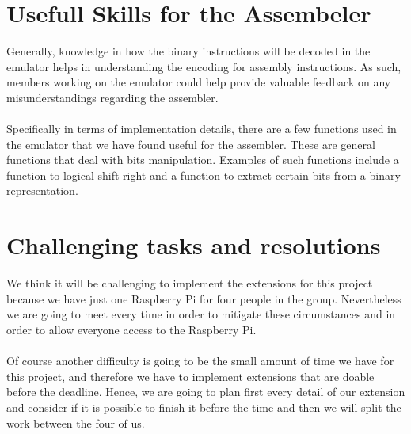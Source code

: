 \documentclass[a4paper]{article}
\begin{document}
\section{Usefull Skills for the Assembeler}
Generally, knowledge in how the binary instructions will be decoded in the emulator helps in understanding the encoding for assembly instructions. As such, members working on the emulator could help provide valuable feedback on any misunderstandings regarding the assembler.
\\\\
Specifically in terms of implementation details, there are a few functions used in the emulator that we have found useful for the assembler. These are general functions that deal with bits manipulation. Examples of such functions include a function to logical shift right and a function to extract certain bits from a binary representation.

\section{Challenging tasks and resolutions}
We think it will be challenging to implement the extensions for this project because we have just one Raspberry Pi for four people in the group. Nevertheless we are going to meet every time in order to mitigate these circumstances and in order to allow everyone access to the Raspberry Pi.
\\\\
Of course another difficulty is going to be the small amount of time we have for this project, and therefore we have to implement extensions that are doable before the deadline. Hence, we are going to plan first every detail of our extension and consider if it is possible to finish it before the time and then we will split the work between the four of us.
\end{document}
